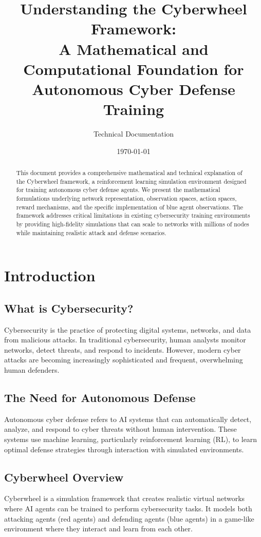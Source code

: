 \documentclass[12pt,a4paper]{article}
\title{\textbf{Understanding the Cyberwheel Framework: \\
A Mathematical and Computational Foundation for \\
Autonomous Cyber Defense Training}}
\author{Technical Documentation}
\date{\today}
\begin{document}
\maketitle

\begin{abstract}
This document provides a comprehensive mathematical and technical explanation of the Cyberwheel framework, a reinforcement learning simulation environment designed for training autonomous cyber defense agents. We present the mathematical formulations underlying network representation, observation spaces, action spaces, reward mechanisms, and the specific implementation of blue agent observations. The framework addresses critical limitations in existing cybersecurity training environments by providing high-fidelity simulations that can scale to networks with millions of nodes while maintaining realistic attack and defense scenarios.
\end{abstract}

\tableofcontents
\newpage

\section{Introduction}

\subsection{What is Cybersecurity?}
Cybersecurity is the practice of protecting digital systems, networks, and data from malicious attacks. In traditional cybersecurity, human analysts monitor networks, detect threats, and respond to incidents. However, modern cyber attacks are becoming increasingly sophisticated and frequent, overwhelming human defenders.

\subsection{The Need for Autonomous Defense}
Autonomous cyber defense refers to AI systems that can automatically detect, analyze, and respond to cyber threats without human intervention. These systems use machine learning, particularly reinforcement learning (RL), to learn optimal defense strategies through interaction with simulated environments.

\subsection{Cyberwheel Overview}
Cyberwheel is a simulation framework that creates realistic virtual networks where AI agents can be trained to perform cybersecurity tasks. It models both attacking agents (red agents) and defending agents (blue agents) in a game-like environment where they interact and learn from each other.
\end{document}
